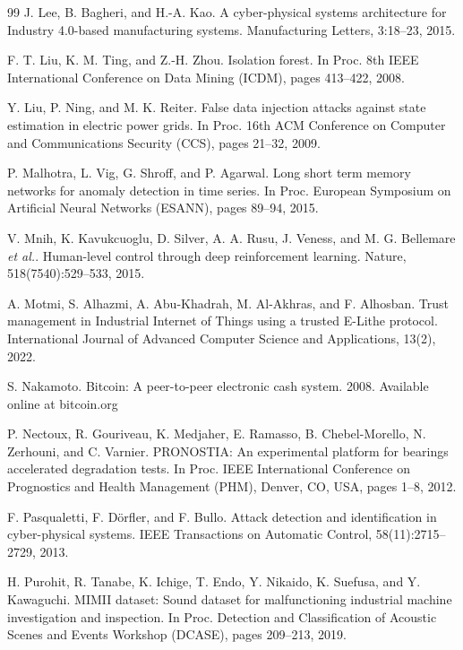 \begin{thebibliography}{99}
 J. Lee, B. Bagheri, and H.-A. Kao. A cyber-physical systems architecture for Industry 4.0-based manufacturing systems. Manufacturing Letters, 3:18--23, 2015.

 F. T. Liu, K. M. Ting, and Z.-H. Zhou. Isolation forest. In Proc. 8th IEEE International Conference on Data Mining (ICDM), pages 413--422, 2008.

 Y. Liu, P. Ning, and M. K. Reiter. False data injection attacks against state estimation in electric power grids. In Proc. 16th ACM Conference on Computer and Communications Security (CCS), pages 21--32, 2009.

 P. Malhotra, L. Vig, G. Shroff, and P. Agarwal. Long short term memory networks for anomaly detection in time series. In Proc. European Symposium on Artificial Neural Networks (ESANN), pages 89--94, 2015.

 V. Mnih, K. Kavukcuoglu, D. Silver, A. A. Rusu, J. Veness, and M. G. Bellemare \emph{et al.}. Human-level control through deep reinforcement learning. Nature, 518(7540):529--533, 2015.

 A. Motmi, S. Alhazmi, A. Abu-Khadrah, M. Al-Akhras, and F. Alhosban. Trust management in Industrial Internet of Things using a trusted E-Lithe protocol. International Journal of Advanced Computer Science and Applications, 13(2), 2022.

 S. Nakamoto. Bitcoin: A peer-to-peer electronic cash system. 2008. Available online at bitcoin.org

 P. Nectoux, R. Gouriveau, K. Medjaher, E. Ramasso, B. Chebel-Morello, N. Zerhouni, and C. Varnier. PRONOSTIA: An experimental platform for bearings accelerated degradation tests. In Proc. IEEE International Conference on Prognostics and Health Management (PHM), Denver, CO, USA, pages 1--8, 2012.

 F. Pasqualetti, F. D\"orfler, and F. Bullo. Attack detection and identification in cyber-physical systems. IEEE Transactions on Automatic Control, 58(11):2715--2729, 2013.

 H. Purohit, R. Tanabe, K. Ichige, T. Endo, Y. Nikaido, K. Suefusa, and Y. Kawaguchi. MIMII dataset: Sound dataset for malfunctioning industrial machine investigation and inspection. In Proc. Detection and Classification of Acoustic Scenes and Events Workshop (DCASE), pages 209--213, 2019.


\end{thebibliography}
